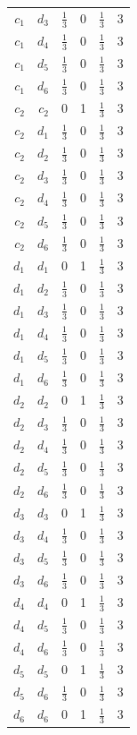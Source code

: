 \begin{longtable}{rrrrrr}
$c_{1}$ & $d_{3}$ & $\frac{1}{3}$ & 0 & $\frac{1}{3}$ & 3\\
$c_{1}$ & $d_{4}$ & $\frac{1}{3}$ & 0 & $\frac{1}{3}$ & 3\\
$c_{1}$ & $d_{5}$ & $\frac{1}{3}$ & 0 & $\frac{1}{3}$ & 3\\
$c_{1}$ & $d_{6}$ & $\frac{1}{3}$ & 0 & $\frac{1}{3}$ & 3\\
$c_{2}$ & $c_{2}$ & $0$ & 1 & $\frac{1}{3}$ & 3\\
$c_{2}$ & $d_{1}$ & $\frac{1}{3}$ & 0 & $\frac{1}{3}$ & 3\\
$c_{2}$ & $d_{2}$ & $\frac{1}{3}$ & 0 & $\frac{1}{3}$ & 3\\
$c_{2}$ & $d_{3}$ & $\frac{1}{3}$ & 0 & $\frac{1}{3}$ & 3\\
$c_{2}$ & $d_{4}$ & $\frac{1}{3}$ & 0 & $\frac{1}{3}$ & 3\\
$c_{2}$ & $d_{5}$ & $\frac{1}{3}$ & 0 & $\frac{1}{3}$ & 3\\
$c_{2}$ & $d_{6}$ & $\frac{1}{3}$ & 0 & $\frac{1}{3}$ & 3\\
$d_{1}$ & $d_{1}$ & $0$ & 1 & $\frac{1}{3}$ & 3\\
$d_{1}$ & $d_{2}$ & $\frac{1}{3}$ & 0 & $\frac{1}{3}$ & 3\\
$d_{1}$ & $d_{3}$ & $\frac{1}{3}$ & 0 & $\frac{1}{3}$ & 3\\
$d_{1}$ & $d_{4}$ & $\frac{1}{3}$ & 0 & $\frac{1}{3}$ & 3\\
$d_{1}$ & $d_{5}$ & $\frac{1}{3}$ & 0 & $\frac{1}{3}$ & 3\\
$d_{1}$ & $d_{6}$ & $\frac{1}{3}$ & 0 & $\frac{1}{3}$ & 3\\
$d_{2}$ & $d_{2}$ & $0$ & 1 & $\frac{1}{3}$ & 3\\
$d_{2}$ & $d_{3}$ & $\frac{1}{3}$ & 0 & $\frac{1}{3}$ & 3\\
$d_{2}$ & $d_{4}$ & $\frac{1}{3}$ & 0 & $\frac{1}{3}$ & 3\\
$d_{2}$ & $d_{5}$ & $\frac{1}{3}$ & 0 & $\frac{1}{3}$ & 3\\
$d_{2}$ & $d_{6}$ & $\frac{1}{3}$ & 0 & $\frac{1}{3}$ & 3\\
$d_{3}$ & $d_{3}$ & $0$ & 1 & $\frac{1}{3}$ & 3\\
$d_{3}$ & $d_{4}$ & $\frac{1}{3}$ & 0 & $\frac{1}{3}$ & 3\\
$d_{3}$ & $d_{5}$ & $\frac{1}{3}$ & 0 & $\frac{1}{3}$ & 3\\
$d_{3}$ & $d_{6}$ & $\frac{1}{3}$ & 0 & $\frac{1}{3}$ & 3\\
$d_{4}$ & $d_{4}$ & $0$ & 1 & $\frac{1}{3}$ & 3\\
$d_{4}$ & $d_{5}$ & $\frac{1}{3}$ & 0 & $\frac{1}{3}$ & 3\\
$d_{4}$ & $d_{6}$ & $\frac{1}{3}$ & 0 & $\frac{1}{3}$ & 3\\
$d_{5}$ & $d_{5}$ & $0$ & 1 & $\frac{1}{3}$ & 3\\
$d_{5}$ & $d_{6}$ & $\frac{1}{3}$ & 0 & $\frac{1}{3}$ & 3\\
$d_{6}$ & $d_{6}$ & $0$ & 1 & $\frac{1}{3}$ & 3\\
\end{longtable}
\endgroup
